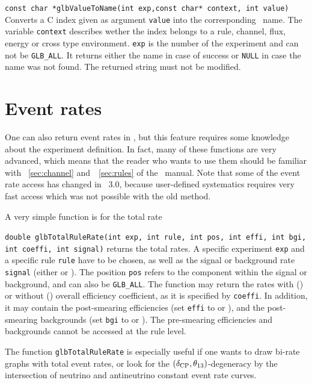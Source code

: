 \begin{function}
{\tt const char *glbValueToName(int exp,const char* context, int value)}
Converts a C index given as argument {\tt value} into the corresponding 
\AEDL\ name. The variable {\tt context} describes wether the index belongs
to a rule, channel, flux, energy or cross type environment. {\tt exp}
is the number of the experiment and can not be {\tt GLB\_ALL}. It returns
either the name in case of success or {\tt NULL} in case the name was not
found. The returned string must not be modified.
\end{function}




\section{Event rates}
\label{sec:event_rates}
One can also return event rates in \GLOBES , but this feature
requires some knowledge about the experiment definition. 
In fact, many of these functions are very advanced, which means
that the reader who wants to use them should be familiar with
\Secs~\ref{sec:channel} and~\Sec~\ref{sec:rules} of the \AEDL\ manual.
Note that some of the event rate access has changed in \GLOBES\ 3.0,
because user-defined systematics requires very fast access which was
not possible with the old method.

A very simple function is for the total rate
\begin{function}
{\tt double glbTotalRuleRate(int exp, int rule, int pos,
int effi, int bgi, int coeffi, int signal)} returns the total rates.
A specific experiment {\tt exp} and a 
specific rule {\tt rule} have to be chosen, as well as the signal
or background rate {\tt signal} (either  or ).
The position {\tt pos} refers to the component within the signal or 
background, and can also be {\tt GLB\_ALL}. The function may return
the rates with () or without ()
overall efficiency coefficient, as it is specified by {\tt coeffi}. 
In addition, it may contain the post-smearing efficiencies (set
{\tt effi} to  or ), and the
post-smearing backgrounds (set
{\tt bgi} to  or ). The pre-smearing
efficiencies and backgrounds cannot be accessed at the rule level.
\end{function}
The function {\tt glbTotalRuleRate} is especially useful if
one wants to draw bi-rate graphs with total event rates, or look
for the $(\delta_{\mathrm{CP}},\theta_{13})$-degeneracy by the intersection of 
neutrino and antineutrino constant event rate curves.

